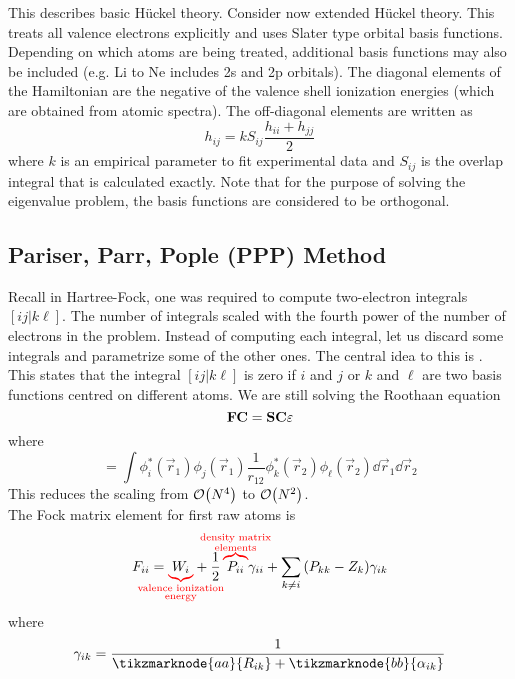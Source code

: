 \documentclass[12pt,a4paper,titlepage]{article}
\newcommand{\trm}[1]{\textrm{#1}} %
\newcommand{\ul}[1]{\underline{\smash{#1}}} %
\begin{document}
This describes basic H\"{u}ckel theory. Consider now extended H\"{u}ckel theory. This treats all valence electrons explicitly and uses Slater type orbital basis functions. Depending on which atoms are being treated, additional basis functions may also be included (e.g. Li to Ne includes 2s and 2p orbitals). The diagonal elements of the Hamiltonian are the negative of the valence shell ionization energies (which are obtained from atomic spectra). The off-diagonal elements are written as
\begin{equation}
h_{ij}=kS_{ij}\frac{h_{ii}+h_{jj}}{2}
\end{equation}
where $k$ is an empirical parameter to fit experimental data and $S_{ij}$ is the overlap integral that is calculated exactly. Note that for the purpose of solving the eigenvalue problem, the basis functions are considered to be orthogonal.

\subsection{Pariser, Parr, Pople (PPP) Method}
Recall in Hartree-Fock, one was required to compute two-electron integrals $[ij|k\ell]$. The number of integrals scaled with the fourth power of the number of electrons in the problem. Instead of computing each integral, let us discard some integrals and parametrize some of the other ones. The central idea to this is \ul{zero-differential overlap (ZDO)}. This states that the integral $[ij|k\ell]$ is zero if $i$ and $j$ or $k$ and $\ell$ are two basis functions centred on different atoms. We are still solving the Roothaan equation
\begin{equation}
\vb{FC}=\vb{SC\varepsilon}
\end{equation}
where
\begin{equation}
[ij|k\ell]=\int\phi_{i}^{*}(\vec{r}_{1})\phi_{j}(\vec{r}_{1})\frac{1}{r_{12}}\phi_{k}^{*}(\vec{r}_{2})\phi_{\ell}(\vec{r}_{2})\dd{\vec{r}_{1}}\dd{\vec{r}_{2}}
\end{equation}
This reduces the scaling from $\order{N^{4}}$ to $\order{N^{2}}$.\\

The Fock matrix element for first raw atoms is
\begin{equation}
F_{ii}={\color{red}\underbrace{\color{black}W_{i}}_{\mathclap{\substack{\trm{valence ionization}\\ \trm{energy}}}}}+\frac{1}{2}\,{\color{red}\overbrace{\color{black}P_{ii}}^{\mathclap{\substack{\trm{density matrix}\\ \trm{elements}}}}}\gamma_{ii}+\sum_{k\neq i}\qty(P_{kk}-Z_{k})\gamma_{ik}
\end{equation}
where
\begin{equation}
\gamma_{ik}=\frac{1}{\tikzmarknode{aa}{R_{ik}}+\tikzmarknode{bb}{\alpha_{ik}}}
\end{equation}
\end{document}
